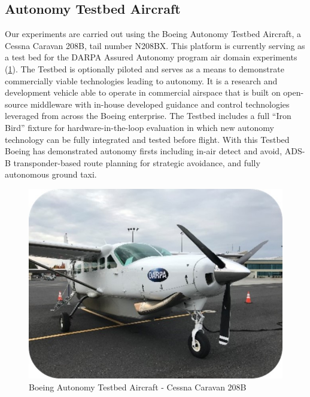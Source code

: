 \subsection{Autonomy Testbed Aircraft}





Our experiments are carried out using the Boeing Autonomy Testbed Aircraft, a Cessna Caravan 208B, tail number N208BX.  This platform is currently serving as a test bed for the DARPA Assured Autonomy program air domain experiments (\ref{fig:caravan}).  The Testbed is optionally piloted and serves as a means to demonstrate commercially viable technologies leading to autonomy.  It is a research and development vehicle able to operate in commercial airspace that is built on open-source middleware with in-house developed guidance and control technologies leveraged from across the Boeing enterprise.  The Testbed includes a full ``Iron Bird'' fixture for hardware-in-the-loop evaluation in which new autonomy technology can be fully integrated and tested before flight.  With this Testbed Boeing has demonstrated autonomy firsts including in-air detect and avoid, ADS-B transponder-based route planning for strategic avoidance, and fully autonomous ground taxi.

\begin{figure}
	\centering
	\includegraphics[width=\columnwidth]{figures/caravan.jpg}
	\caption{Boeing Autonomy Testbed Aircraft - Cessna Caravan 208B}
	\label{fig:caravan}
\end{figure}

